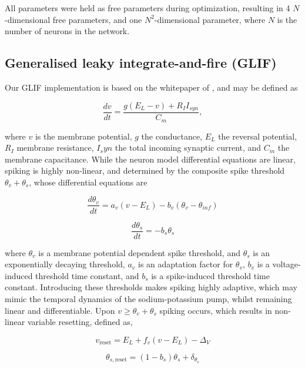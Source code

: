\documentclass[mphil,deptreport,ianc]{infthesis} %
\begin{document}
All parameters were held as free parameters during optimization, resulting in 4 $N$-dimensional free parameters, and one $N^2$-dimensional parameter, where $N$ is the number of neurons in the network. 


\subsection{Generalised leaky integrate-and-fire (GLIF)}

Our GLIF implementation is based on the whitepaper of \cite{allen_glif_white_paper}, and may be defined as

\begin{equation}
    \frac{dv}{dt} = \frac{g (E_L - v) + R_I I_{syn}}{C_m},
\end{equation}

where $v$ is the membrane potential, $g$ the conductance, $E_L$ the reversal potential, $R_I$ membrane resistance, $I_syn$ the total incoming synaptic current, and $C_m$ the membrane capacitance.
While the neuron model differential equations are linear, spiking is highly non-linear, and determined by the composite spike threshold $\theta_v + \theta_s$, whose differential equations are

\begin{equation}
    \frac{d\theta_v}{dt} = a_v (v - E_L) - b_v (\theta_v - \theta_{inf})
\end{equation}


\begin{equation}
    \frac{d\theta_s}{dt} = - b_s \theta_s
\end{equation}

where $\theta_v$ is a membrane potential dependent spike threshold, and $\theta_s$ is an exponentially decaying threshold, $a_v$ is an adaptation factor for $\theta_v$, $b_v$ is a voltage-induced threshold time constant, and $b_s$ is a spike-induced threshold time constant.
Introducing these thresholds makes spiking highly adaptive, which may mimic the temporal dynamics of the sodium-potassium pump, whilst remaining linear and differentiable.
Upon $v \geq \theta_v + \theta_s$ spiking occurs, which results in non-linear variable resetting, defined as,

\begin{equation}
    v_{\text{reset}} = E_L + f_v (v - E_L) - \Delta_V
\end{equation}

\begin{equation}
    \theta_{s,\text{reset}} = (1 - b_s) \theta_s + \delta_{\theta_s}
\end{equation}
\end{document}
